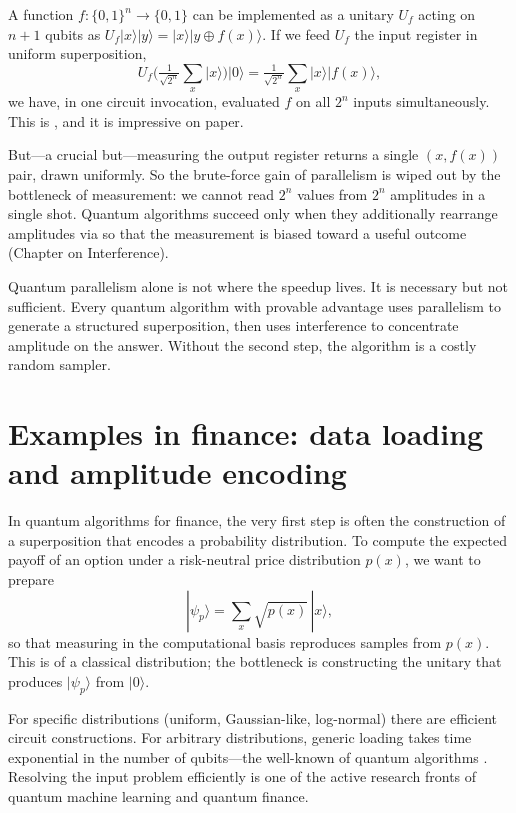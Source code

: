 A function $f:\{0,1\}^n \to \{0,1\}$ can be implemented as a unitary $U_f$ acting on $n+1$ qubits as $U_f|x\rangle|y\rangle = |x\rangle|y \oplus f(x)\rangle$. If we feed $U_f$ the input register in uniform superposition,
\[
  U_f \Big(\tfrac{1}{\sqrt{2^n}}\sum_x |x\rangle\Big)|0\rangle = \tfrac{1}{\sqrt{2^n}}\sum_x |x\rangle|f(x)\rangle,
\]
we have, in one circuit invocation, evaluated $f$ on all $2^n$ inputs simultaneously. This is , and it is impressive on paper.

But---a crucial but---measuring the output register returns a single $(x, f(x))$ pair, drawn uniformly. So the brute-force gain of parallelism is wiped out by the bottleneck of measurement: we cannot read $2^n$ values from $2^n$ amplitudes in a single shot. Quantum algorithms succeed only when they additionally rearrange amplitudes via  so that the measurement is biased toward a useful outcome (Chapter on Interference).

\begin{remark}
Quantum parallelism alone is not where the speedup lives. It is necessary but not sufficient. Every quantum algorithm with provable advantage uses parallelism to generate a structured superposition, then uses interference to concentrate amplitude on the answer. Without the second step, the algorithm is a costly random sampler.
\end{remark}

\section{Examples in finance: data loading and amplitude encoding}

In quantum algorithms for finance, the very first step is often the construction of a superposition that encodes a probability distribution. To compute the expected payoff of an option under a risk-neutral price distribution $p(x)$, we want to prepare
\[
  |\psi_p\rangle = \sum_x \sqrt{p(x)}\,|x\rangle,
\]
so that measuring in the computational basis reproduces samples from $p(x)$. This is  of a classical distribution; the bottleneck is constructing the unitary that produces $|\psi_p\rangle$ from $|0\rangle$.

For specific distributions (uniform, Gaussian-like, log-normal) there are efficient circuit constructions. For arbitrary distributions, generic loading takes time exponential in the number of qubits---the well-known  of quantum algorithms \citep{biamonte_quantum_2017}. Resolving the input problem efficiently is one of the active research fronts of quantum machine learning and quantum finance.

